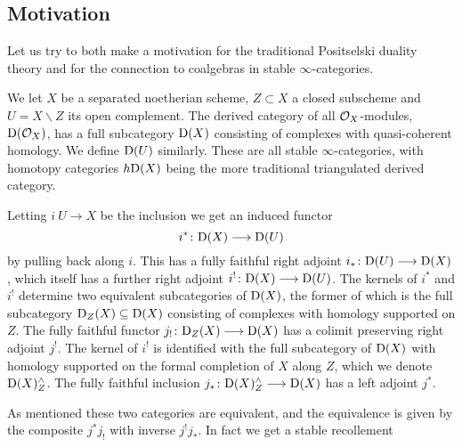\subsection*{Motivation}

Let us try to both make a motivation for the traditional Positselski duality theory and for the connection to coalgebras in stable $\infty$-categories. 

We let $X$ be a separated noetherian scheme, $Z\subset X$ a closed subscheme and $U = X\backslash Z$ its open complement. The derived category of all $\mathcal{O}_X$-modules, $\mathrm{D}(\mathcal{O}_X)$, has a full subcategory $\mathrm{D}(X)$ consisting of complexes with quasi-coherent homology. We define $\mathrm{D}(U)$ similarly. These are all stable $\infty$-categories, with homotopy categories $h\mathrm{D}(X)$ being the more traditional triangulated derived category.  

Letting $i\:U\to X$ be the inclusion we get an induced functor 
\[i^*\colon \mathrm{D}(X)\longrightarrow \mathrm{D}(U)\]
by pulling back along $i$. This has a fully faithful right adjoint $i_*\colon \mathrm{D}(U)\longrightarrow \mathrm{D}(X)$, which itself has a further right adjoint $i^!\colon \mathrm{D}(X)\longrightarrow \mathrm{D}(U)$. The kernels of $i^*$ and $i^!$ determine two equivalent subcategories of $\mathrm{D}(X)$, the former of which is the full subcategory $\mathrm{D}_Z(X)\subseteq \mathrm{D}(X)$ consisting of complexes with homology supported on $Z$. The fully faithful functor $j_!\colon \mathrm{D}_Z(X)\longrightarrow \mathrm{D}(X)$ has a colimit preserving right adjoint $j^!$. The kernel of $i^!$ is identified with the full subcategory of $\mathrm{D}(X)$ with homology supported on the formal completion of $X$ along $Z$, which we denote $\mathrm{D}(X)^\wedge_Z$. The fully faithful inclusion $j_*\colon\mathrm{D}(X)^\wedge_Z \longrightarrow \mathrm{D}(X)$ has a left adjoint $j^*$. 

As mentioned these two categories are equivalent, and the equivalence is given by the composite $j^* j_!$ with inverse $j^! j_*$. In fact we get a stable recollement
\begin{center}
\end{center}


